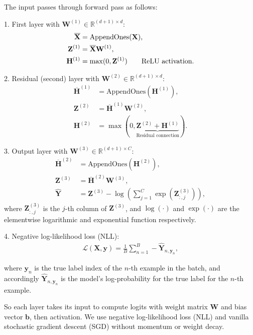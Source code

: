 \documentclass{article}
\begin{document}
The input passes through forward pass as follows:

1. First layer with $\mathbf{W}^{(1)} \in \mathbb{R}^{(d+1) \times d}$:
\begin{align*}
\overline{\mathbf{X}} &= \text{AppendOnes}(\mathbf{X}) , \\
\mathbf{Z}^{(1)} &= \overline{\mathbf{X}}\mathbf{W}^{(1)} , \\
\mathbf{H}^{(1)} &= \max(0, \mathbf{Z}^{(1)}) \tag*{\text{ReLU activation}} .
\end{align*}

2. Residual (second) layer with $\mathbf{W}^{(2)} \in \mathbb{R}^{(d+1) \times d}$:
\begin{align*}
\mathbf{\overline{H}}^{(1)} &= \text{AppendOnes}(\mathbf{H}^{(1)}) , \\
\mathbf{Z}^{(2)} &= \mathbf{\overline{H}}^{(1)}\mathbf{W}^{(2)} ,\\
\mathbf{H}^{(2)} &= \max\left(0, \underbrace{\mathbf{Z}^{(2)} + \mathbf{H}^{(1)}}_{\text{Residual connection}}\right) .
\end{align*}

3. Output layer with $\mathbf{W}^{(3)} \in \mathbb{R}^{(d + 1) \times C}$:
\begin{align*}
\mathbf{\overline{H}}^{(2)} &= \text{AppendOnes}(\mathbf{H}^{(2)}) , \\
\mathbf{Z}^{(3)} &= \mathbf{\overline{H}}^{(2)}\mathbf{W}^{(3)} ,\\
\mathbf{\hat{Y}} &= \mathbf{Z}^{(3)} - \log\left(\sum_{j=1}^{C} \exp(\mathbf{Z}^{(3)}_{:, j})\right) \tag*{Log-Softmax for log probabilities} ,
\end{align*}
where $\mathbf{Z}^{(3)}_{:, j}$ is the $j$-th column of $\mathbf{Z}^{(3)}$, and $\log(\cdot)$ and $\exp(\cdot)$ are the elementwise logarithmic and exponential function respectively.


4. Negative log-likelihood loss (NLL):
\begin{align*}
\mathcal{L} (\mathbf{X}, \mathbf{y}) = \frac{1}{B} \sum_{n=1}^B - \mathbf{\hat{Y}}_{n, \mathbf{y}_n} ,
\end{align*}
    
where $\mathbf{y}_n$ is the true label index of the $n$-th example in the batch, and accordingly $\mathbf{\hat{Y}}_{n, \mathbf{y}_n}$ is the model's log-probability for the true label for the $n$-th example.

So each layer takes its input to compute logits with weight matrix $\mathbf{W}$ and bias vector $\mathbf{b}$, then activation. We use negative log-likelihood loss (NLL) and vanilla stochastic gradient descent (SGD) without momentum or weight decay. 
\end{document}
